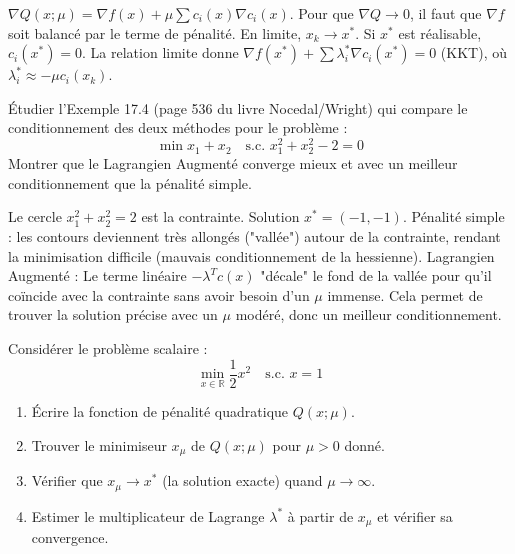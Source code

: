 \begin{correction}
$\nabla Q(x; \mu) = \nabla f(x) + \mu \sum c_i(x) \nabla c_i(x)$.
Pour que $\nabla Q \to 0$, il faut que $\nabla f$ soit balancé par le terme de pénalité.
En limite, $x_k \to x^*$.
Si $x^*$ est réalisable, $c_i(x^*) = 0$.
La relation limite donne $\nabla f(x^*) + \sum \lambda_i^* \nabla c_i(x^*) = 0$ (KKT), où $\lambda_i^* \approx -\mu c_i(x_k)$.
\end{correction}
\bigskip

\bigskip
\begin{exercice}
Étudier l'Exemple 17.4 (page 536 du livre Nocedal/Wright) qui compare le conditionnement des deux méthodes pour le problème :
$$ \min x_1 + x_2 \quad \text{s.c. } x_1^2 + x_2^2 - 2 = 0 $$
Montrer que le Lagrangien Augmenté converge mieux et avec un meilleur conditionnement que la pénalité simple.
\end{exercice}

\begin{correction}
Le cercle $x_1^2 + x_2^2 = 2$ est la contrainte. Solution $x^*=(-1,-1)$.
Pénalité simple : les contours deviennent très allongés ("vallée") autour de la contrainte, rendant la minimisation difficile (mauvais conditionnement de la hessienne).
Lagrangien Augmenté : Le terme linéaire $-\lambda^T c(x)$ "décale" le fond de la vallée pour qu'il coïncide avec la contrainte sans avoir besoin d'un $\mu$ immense.
Cela permet de trouver la solution précise avec un $\mu$ modéré, donc un meilleur conditionnement.
\end{correction}
\bigskip

\bigskip
\begin{exercice}
Considérer le problème scalaire :
$$ \min_{x \in \mathbb{R}} \frac{1}{2}x^2 \quad \text{s.c. } x = 1 $$
\begin{enumerate}
    \item Écrire la fonction de pénalité quadratique $Q(x; \mu)$.
    \item Trouver le minimiseur $x_\mu$ de $Q(x; \mu)$ pour $\mu > 0$ donné.
    \item Vérifier que $x_\mu \to x^*$ (la solution exacte) quand $\mu \to \infty$.
    \item Estimer le multiplicateur de Lagrange $\lambda^*$ à partir de $x_\mu$ et vérifier sa convergence.
\end{enumerate}
\end{exercice}

